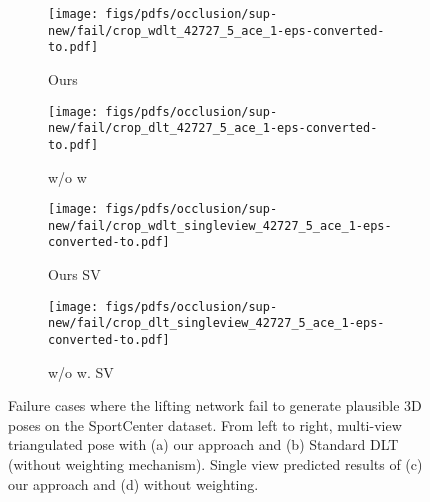\documentclass[runningheads]{llncs}
\begin{document}
\begin{figure*}
	\begin{subfigure}[b]{0.24\linewidth}        \centering
		\texttt{[image: figs/pdfs/occlusion/sup-new/fail/crop\_wdlt\_42727\_5\_ace\_1-eps-converted-to.pdf]}
		\caption{Ours}
\end{subfigure}
	\begin{subfigure}[b]{0.24\linewidth}        \centering
		\texttt{[image: figs/pdfs/occlusion/sup-new/fail/crop\_dlt\_42727\_5\_ace\_1-eps-converted-to.pdf]}
		\caption{w/o w}
\end{subfigure}
	\begin{subfigure}[b]{0.24\linewidth}        \centering
		\texttt{[image: figs/pdfs/occlusion/sup-new/fail/crop\_wdlt\_singleview\_42727\_5\_ace\_1-eps-converted-to.pdf]}
		\caption{Ours SV}
\end{subfigure}
	\begin{subfigure}[b]{0.24\linewidth}        \centering
		\texttt{[image: figs/pdfs/occlusion/sup-new/fail/crop\_dlt\_singleview\_42727\_5\_ace\_1-eps-converted-to.pdf]}
		\caption{\small w/o w. SV}
\end{subfigure}

	\vspace{-0.3cm}
	\caption{\small Failure cases where the lifting network  fail to generate plausible 3D poses on the SportCenter dataset. From left to right, multi-view triangulated pose with (a) our approach and (b) Standard DLT (without weighting mechanism). Single view predicted results of (c) our approach and (d) without weighting.
	}
	\label{fig:occlusion_images_fail_1}
\end{figure*} 
\end{document}
